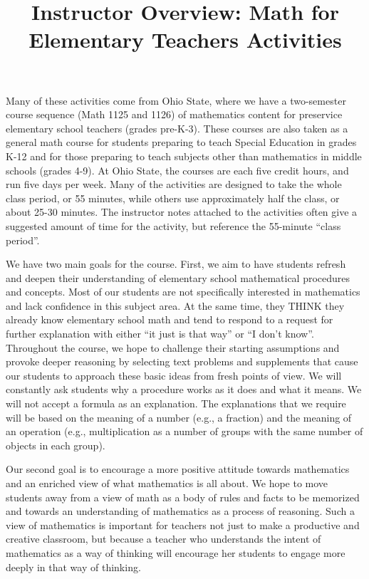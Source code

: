 \documentclass{ximera}
\title{Instructor Overview: Math for Elementary Teachers Activities}
\begin{document}
\begin{abstract}\end{abstract}\maketitle

Many of these activities come from Ohio State, where we have a two-semester course sequence 
(Math 1125 and 1126) of mathematics content for preservice elementary school teachers 
(grades pre-K-3).  These courses are also taken as a general math course for students preparing 
to teach Special Education in grades K-12 and for those preparing to teach subjects other than 
mathematics in middle schools (grades 4-9).  At Ohio State, the courses are each five credit 
hours, and run five days per week.  Many of the activities are designed to take the whole class 
period, or 55 minutes, while others use approximately half the class, or about 25-30 minutes.  
The instructor notes attached to the activities often give a suggested amount of time for the 
activity, but reference the 55-minute ``class period''.

We have two main goals for the course.  First, we aim to have students refresh and deepen their 
understanding of elementary school mathematical procedures and concepts.  Most of our students 
are not specifically interested in mathematics and lack confidence in this subject area.  At the 
same time, they THINK they already know elementary school math and tend to respond to a request 
for further explanation with either ``it just is that way'' or ``I don't know''.  Throughout the 
course, we hope to challenge their starting assumptions and provoke deeper reasoning by selecting 
text problems and supplements that cause our students to approach these basic ideas from fresh 
points of view.  We will constantly ask students why a procedure works as it does and what it 
means.  We will not accept a formula as an explanation.  The explanations that we require will be 
based on the meaning of a number (e.g., a fraction) and the meaning of an operation (e.g., 
multiplication as a number of groups with the same number of objects in each group).  

Our second goal is to encourage a more positive attitude towards mathematics and an enriched view 
of what mathematics is all about.  We hope to move students away from a view of math as a body of 
rules and facts to be memorized and towards an understanding of mathematics as a process of 
reasoning. Such a view of mathematics is important for teachers not just to make a productive and 
creative classroom, but because a teacher who understands the intent of mathematics as a way of 
thinking will encourage her students to engage more deeply in that way of thinking.  
\end{document}
